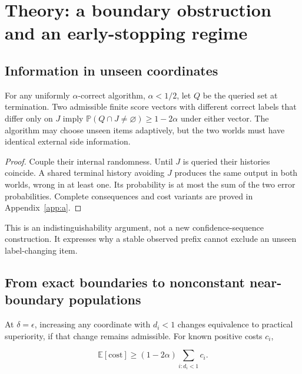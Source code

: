 \section{Theory: a boundary obstruction and an early-stopping regime}\label{sec:5}\label{theory-a-boundary-obstruction-and-an-early-stopping-regime}

\subsection{Information in unseen coordinates}\label{information-in-unseen-coordinates}

\begin{theorem}\label{main-theorem1} For any uniformly \(\alpha\)-correct algorithm, \(\alpha<1/2\), let $Q$ be the queried set at termination. Two admissible finite score vectors with different correct labels that differ only on \(J\) imply \(\mathbb P(Q\cap J\ne\varnothing)\ge1-2\alpha\) under either vector. The algorithm may choose unseen items adaptively, but the two worlds must have identical external side information.
\end{theorem}

\begin{proof} Couple their internal randomness. Until \(J\) is queried their histories coincide. A shared terminal history avoiding \(J\) produces the same output in both worlds, wrong in at least one. Its probability is at most the sum of the two error probabilities. Complete consequences and cost variants are proved in Appendix~\ref{app:a}.\end{proof}

This is an indistinguishability argument, not a new confidence-sequence construction. It expresses why a stable observed prefix cannot exclude an unseen label-changing item.

\subsection{From exact boundaries to nonconstant near-boundary populations}\label{from-exact-boundaries-to-nonconstant-near-boundary-populations}

At \(\delta=\epsilon\), increasing any coordinate with \(d_i<1\) changes equivalence to practical superiority, if that change remains admissible. For known positive costs \(c_i\),

\begin{equation}\label{eq:5-1}
\mathbb E[\mathrm{cost}]\ge(1-2\alpha)\sum_{i:d_i<1}c_i.
\end{equation}

